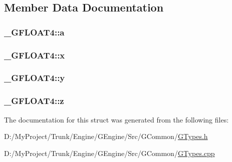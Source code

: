 \subsection{Member Data Documentation}
\hypertarget{struct___g_f_l_o_a_t4_a11ff967d590695404082aa470c8559e6}{}
\subsubsection[{a}]{ \+\_\+\+G\+F\+L\+O\+A\+T4\+::a}\label{struct___g_f_l_o_a_t4_a11ff967d590695404082aa470c8559e6}
\hypertarget{struct___g_f_l_o_a_t4_ad38242f9bef0a562e6bdb3c08985e434}{}
\subsubsection[{x}]{ \+\_\+\+G\+F\+L\+O\+A\+T4\+::x}\label{struct___g_f_l_o_a_t4_ad38242f9bef0a562e6bdb3c08985e434}
\hypertarget{struct___g_f_l_o_a_t4_a6bbd34c5b00c322cd7e17df0a47f9b91}{}
\subsubsection[{y}]{ \+\_\+\+G\+F\+L\+O\+A\+T4\+::y}\label{struct___g_f_l_o_a_t4_a6bbd34c5b00c322cd7e17df0a47f9b91}
\hypertarget{struct___g_f_l_o_a_t4_a8d4c5d28952dca8ba3bd31478dce77fe}{}
\subsubsection[{z}]{ \+\_\+\+G\+F\+L\+O\+A\+T4\+::z}\label{struct___g_f_l_o_a_t4_a8d4c5d28952dca8ba3bd31478dce77fe}


The documentation for this struct was generated from the following files\+:\begin{DoxyCompactItemize}
\item 
D\+:/\+My\+Project/\+Trunk/\+Engine/\+G\+Engine/\+Src/\+G\+Common/\hyperlink{_g_types_8h}{G\+Types.\+h}\item 
D\+:/\+My\+Project/\+Trunk/\+Engine/\+G\+Engine/\+Src/\+G\+Common/\hyperlink{_g_types_8cpp}{G\+Types.\+cpp}\end{DoxyCompactItemize}
